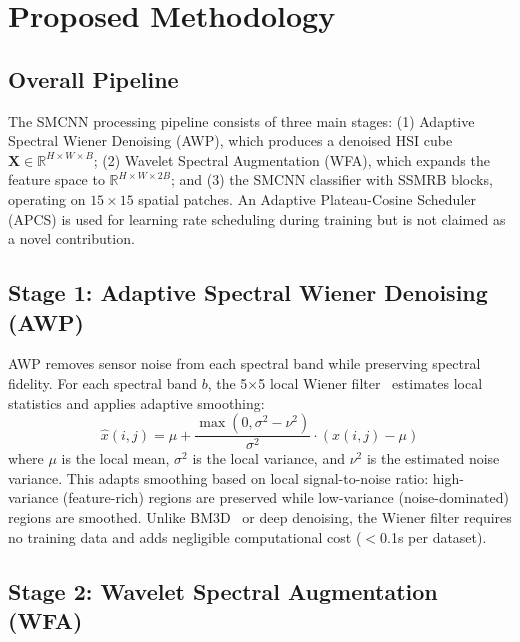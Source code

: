 \documentclass[conference]{IEEEtran}
\begin{document}
\section{Proposed Methodology}

\subsection{Overall Pipeline}

The SMCNN processing pipeline consists of three main stages: (1) Adaptive Spectral Wiener Denoising (AWP), which produces a denoised HSI cube $\mathbf{X} \in \mathbb{R}^{H \times W \times B}$; (2) Wavelet Spectral Augmentation (WFA), which expands the feature space to $\mathbb{R}^{H \times W \times 2B}$; and (3) the SMCNN classifier with SSMRB blocks, operating on $15 \times 15$ spatial patches. An Adaptive Plateau-Cosine Scheduler (APCS) is used for learning rate scheduling during training but is not claimed as a novel contribution.

\subsection{Stage 1: Adaptive Spectral Wiener Denoising (AWP)}

AWP removes sensor noise from each spectral band while preserving spectral fidelity. For each spectral band $b$, the 5$\times$5 local Wiener filter~\cite{wiener1949extrapolation} estimates local statistics and applies adaptive smoothing:
\begin{equation}
\hat{x}(i,j) = \mu + \frac{\max(0, \sigma^2 - \nu^2)}{\sigma^2} \cdot (x(i,j) - \mu)
\end{equation}
where $\mu$ is the local mean, $\sigma^2$ is the local variance, and $\nu^2$ is the estimated noise variance. This adapts smoothing based on local signal-to-noise ratio: high-variance (feature-rich) regions are preserved while low-variance (noise-dominated) regions are smoothed. Unlike BM3D~\cite{dabov2007image} or deep denoising, the Wiener filter requires no training data and adds negligible computational cost ($<$0.1s per dataset).

\subsection{Stage 2: Wavelet Spectral Augmentation (WFA)}
\end{document}
